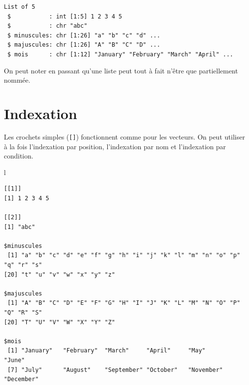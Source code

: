 \documentclass[
  letterpaper,
  DIV=11,
  numbers=noendperiod,
  oneside]{scrreprt}
\newenvironment{Shaded}{\begin{snugshade}}{\end{snugshade}}
\newcommand{\NormalTok}[1]{\textcolor[rgb]{0.00,0.23,0.31}{#1}}
\begin{document}
\begin{verbatim}
List of 5
 $           : int [1:5] 1 2 3 4 5
 $           : chr "abc"
 $ minuscules: chr [1:26] "a" "b" "c" "d" ...
 $ majuscules: chr [1:26] "A" "B" "C" "D" ...
 $ mois      : chr [1:12] "January" "February" "March" "April" ...
\end{verbatim}

\begin{tcolorbox}[enhanced jigsaw, colbacktitle=quarto-callout-note-color!10!white, opacityback=0, toprule=.15mm, colback=white, coltitle=black, bottomtitle=1mm, toptitle=1mm, titlerule=0mm, rightrule=.15mm, title=\textcolor{quarto-callout-note-color}{\faInfo}\hspace{0.5em}{Note}, breakable, bottomrule=.15mm, opacitybacktitle=0.6, arc=.35mm, left=2mm, leftrule=.75mm, colframe=quarto-callout-note-color-frame]

On peut noter en passant qu'une liste peut tout à fait n'être que
partiellement nommée.

\end{tcolorbox}

\hypertarget{indexation}{%
\section{Indexation}\label{indexation}}

Les crochets simples (\texttt{{[}{]}}) fonctionnent comme pour les
vecteurs. On peut utiliser à la fois l'indexation par position,
l'indexation par nom et l'indexation par condition.

\begin{Shaded}
\begin{Highlighting}[]
\NormalTok{l}
\end{Highlighting}
\end{Shaded}

\begin{verbatim}
[[1]]
[1] 1 2 3 4 5

[[2]]
[1] "abc"

$minuscules
 [1] "a" "b" "c" "d" "e" "f" "g" "h" "i" "j" "k" "l" "m" "n" "o" "p" "q" "r" "s"
[20] "t" "u" "v" "w" "x" "y" "z"

$majuscules
 [1] "A" "B" "C" "D" "E" "F" "G" "H" "I" "J" "K" "L" "M" "N" "O" "P" "Q" "R" "S"
[20] "T" "U" "V" "W" "X" "Y" "Z"

$mois
 [1] "January"   "February"  "March"     "April"     "May"       "June"     
 [7] "July"      "August"    "September" "October"   "November"  "December" 
\end{verbatim}
\end{document}
